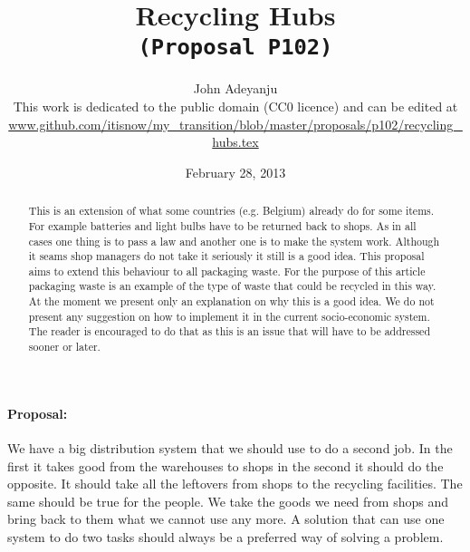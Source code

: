 \documentclass{article}
\begin{document}
\title{Recycling Hubs\\\tt{\small{(Proposal P102)}}\\\tt{\small{}}}%
\author{John Adeyanju\\\small{This work is dedicated to the public domain (CC0 licence) and can be edited at}\\ \scriptsize{\url{www.github.com/itisnow/my_transition/blob/master/proposals/p102/recycling_hubs.tex}}}
\date{February 28, 2013}

\maketitle

\begin{abstract}
This is an extension of what some countries (e.g. Belgium) already do for some items.
For example batteries and light bulbs have to be returned back to shops.
As in all cases one thing is to pass a law and another one is to make the system work.
Although it seams shop managers do not take it seriously it still is a good idea.
This proposal aims to extend this behaviour to all packaging waste.
For the purpose of this article packaging waste is an example of the type of waste that could be recycled in this way.
At the moment we present only an explanation on why this is a good idea.
We do not present any suggestion on how to implement it in the current socio-economic system.
The reader is encouraged to do that as this is an issue that will have to be addressed sooner or later.
\end{abstract}

\paragraph{Proposal:}
We have a big distribution system that we should use to do a second job.
In the first it takes good from the warehouses to shops in the second it should do the opposite.
It should take all the leftovers from shops to the recycling facilities.
The same should be true for the people.
We take the goods we need from shops and bring back to them what we cannot use any more.
A solution that can use one system to do two tasks should always be a preferred way of solving a problem.
\end{document}
